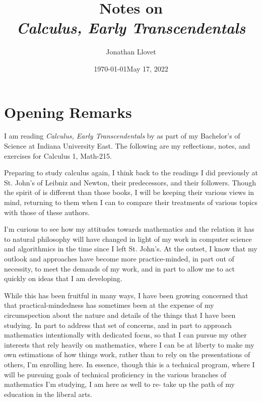 \documentclass[leqno, 11pt]{report}
\title{Notes on\\\textit{Calculus, Early Transcendentals}}
\author{Jonathan Llovet}
\date{\today}
\numberwithin{equation}{section}
\begin{document}
\maketitle

\tableofcontents

\newpage

\setcounter{chapter}{-1}

\chapter{Opening Remarks}

\date{May 17, 2022}

I am reading \textit{Calculus, Early Transcendentals} by \citeauthor{briggsCalculusEarlyTranscendentals2019}
as part of my Bachelor's of Science at Indiana University East. The following are my reflections, notes, and
exercises for Calculus 1, Math-215.

Preparing to study calculus again,
I think back to the readings I did previously
at St. John's of Leibniz and Newton, their predecessors, and their followers.
Though the spirit of 
is different than those books, I will be keeping their various views in mind,
returning to them when I can to compare their treatments of various topics with those
of these authors.

I'm curious to see how my attitudes towards mathematics and the relation it has
to natural philosophy will have changed in light of my work in computer science
and algorithmics in the time since I left St. John's. At the outset, I know that
my outlook and approaches have become more practice-minded, in part out of necessity,
to meet the demands of my work, and in part to allow me to act quickly on ideas
that I am developing.

While this has been fruitful in many ways, I have been growing concerned that
that practical-mindedness has sometimes been at the expense of my circumspection
about the nature and details of the things that I have been studying.
In part to address that set of concerns, and in part to approach mathematics intentionally
with dedicated focus, so that I can pursue my other interests that rely heavily
on mathematics, where I can be at liberty to make my own estimations of how things work,
rather than to rely on the presentations of others, I'm enrolling here.
In essence, though this is a technical program, where I will be pursuing
goals of technical proficiency in the various branches of mathematics I'm studying,
I am here as well to re- take up the path of my education in the liberal arts.
\end{document}
